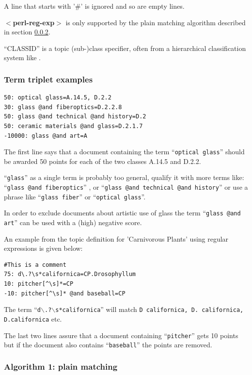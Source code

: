 A line that starts with '\#' is ignored and so are empty lines.

{\bf$<$perl-reg-exp$>$} is only supported by the plain
matching algorithm described in section \ref{std}.

``CLASSID'' is a topic (sub-)class specifier, often from a hierarchical
classification system like .

\subsubsection{Term triplet examples}

\begin{verbatim}
50: optical glass=A.14.5, D.2.2
30: glass @and fiberoptics=D.2.2.8
50: glass @and technical @and history=D.2
50: ceramic materials @and glass=D.2.1.7
-10000: glass @and art=A
\end{verbatim}

The first line says that a document containing the term ``{\tt optical
glass}'' should be awarded 50 points for each of the two classes A.14.5 and
D.2.2.

``{\tt glass}'' as a single term is probably too general, qualify it with more terms
  like: ``{\tt glass @and fiberoptics}'' , or ``{\tt glass @and technical @and history}''
  or  use a phrase like ``{\tt glass fiber}'' or ``{\tt optical glass}''.

  In order to exclude documents about artistic use of glass the term 
  ``{\tt glass @and art}'' can be used with a (high) negative score.

An example from the topic definition for 'Carnivorous Plants' using
  regular expressions is given below:
\begin{verbatim}
#This is a comment
75: d\.?\s*californica=CP.Drosophyllum
10: pitcher[^\s]*=CP
-10: pitcher[^\s]* @and baseball=CP
\end{verbatim}
The term ``{\tt d$\backslash$.?$\backslash$s*californica}''
 will match {\tt D californica, D. californica, D.californica} etc.

The last two lines assure that a document containing ``{\tt pitcher}'' gets
10 points but if the document also contains ``{\tt baseball}'' the points are removed.

\subsubsection{Algorithm 1: plain matching}
\label{std}


